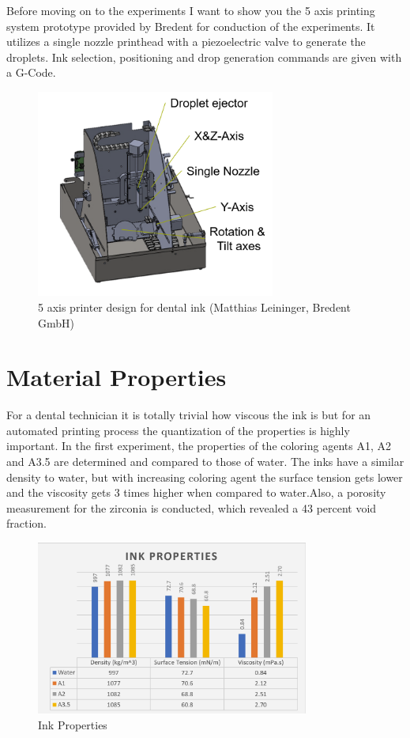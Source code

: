 Before moving on to the experiments I want to show you the 5 axis printing system prototype provided by Bredent for conduction of the experiments. 
It utilizes a single nozzle printhead  with a piezoelectric valve to generate the droplets. Ink selection, positioning and drop generation commands are given with a G-Code.
\begin{figure}[h]
	\centering
	\includegraphics[width=0.7\textwidth]{grafiken/PrototypeText.png}
	\caption{5 axis printer design for dental ink (Matthias Leininger, Bredent GmbH)}
	\label{fig:Prototype}
\end{figure} 

\section{Material Properties}
For a dental technician it is totally trivial how viscous the ink is but for an automated printing  process the quantization of the properties is highly important. In the first experiment, the properties of the coloring agents A1, A2 and A3.5 are determined and compared to those of water. The inks have a similar density to water, but with increasing coloring agent the surface tension gets lower and the viscosity gets 3 times higher when compared to water.Also, a porosity measurement for the zirconia is conducted, which revealed a 43 percent void fraction.
\begin{figure}[h]
	\centering
	\includegraphics[width=0.8\textwidth]{grafiken/InkProps.jpg}
	\caption{Ink Properties}
	\label{fig:InkProps}
\end{figure} 

